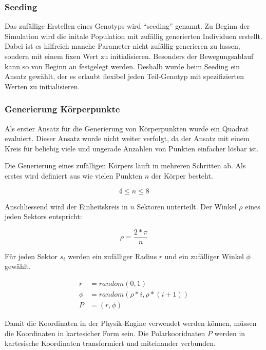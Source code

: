       \subsubsection{Seeding\label{subsub:GenotypeSeeding}}

        Das zufällige Erstellen eines Genotyps wird ``seeding'' genannt.
        Zu Beginn der Simulation wird die initale Population mit zufällig generierten Individuen erstellt.
        Dabei ist es hilfreich manche Parameter nicht zufällig generieren zu lassen,
        sondern mit einem fixen Wert zu initialisieren.
        Besonders der Bewegungsablauf kann so von Beginn an festgelegt werden.
        Deshalb wurde beim Seeding ein Ansatz gewählt, der es erlaubt flexibel jeden Teil-Genotyp mit
        spezifizierten Werten zu initialisieren.

      \subsubsection{Generierung Körperpunkte\label{subsub:GenotypeBodypointCreation}}

        Als erster Ansatz für die Generierung von Körperpunkten wurde ein Quadrat evaluiert.
        Dieser Ansatz wurde nicht weiter verfolgt,
        da der Ansatz mit einem Kreis für beliebig viele und ungerade Anzahlen von Punkten einfacher lösbar ist.

        \smallskip

        Die Generierung eines zufälligen Körpers läuft in mehreren Schritten ab.
        Als erstes wird definiert aus wie vielen Punkten \( n \) der Körper besteht.

        \[ 4 \leq n \leq 8 \]

        Anschliessend wird der Einheitskreis in \( n \) Sektoren unterteilt.
        Der Winkel \( \rho \) eines jeden Sektors entspricht:

        \[ \rho = \frac{2 * \pi}{n} \]

        Für jeden Sektor \( s_{i} \) werden ein zufälliger Radius \( r \) und ein zufälliger Winkel \( \phi \) gewählt.

        \begin{align*}
          r &= random(0, 1) \\
          \phi &= random(\rho * i, \rho * (i + 1)) \\
          P &= (r, \phi)
        \end{align*}

        Damit die Koordinaten in der Physik-Engine verwendet werden können,
        müssen die Koordinaten in kartesicher Form sein.
        Die Polarkooridnaten \( P \) werden in kartesische Koordinaten transformiert und miteinander verbunden.

